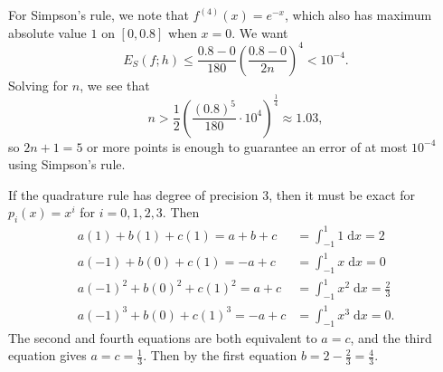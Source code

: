 \documentclass{homework}
\begin{document}
\begin{alphaparts}
		For Simpson's rule, we note that $f^{(4)}(x) = e^{-x}$, which also has maximum absolute value $1$ on $[0,0.8]$ when $x = 0$. We want
		\begin{equation*}
			E_S(f;h) \le \frac{0.8 - 0}{180}\left(\frac{0.8-0}{2n}\right)^4 < 10^{-4}.
		\end{equation*}
		Solving for $n$, we see that
		\begin{equation*}
			n > \frac{1}{2}\left(\frac{(0.8)^5}{180}\cdot 10^{4}\right)^\frac{1}{4} \approx 1.03,
		\end{equation*}
		so $2n+1 = 5$ or more points is enough to guarantee an error of at most $10^{-4}$ using Simpson's rule.
	\end{alphaparts}
	
	\question If the quadrature rule has degree of precision 3, then it must be exact for $p_i(x) = x^i$ for $i=0,1,2,3$. Then
	\begin{align*}
		a(1) + b(1) + c(1) = a+b+c &= \int_{-1}^1 1\;\text{d}x = 2 \\
		a(-1) + b(0) + c(1) = -a + c &= \int_{-1}^1 x\;\text{d}x = 0 \\
		a(-1)^2 + b(0)^2 + c(1)^2 = a+ c &= \int_{-1}^1 x^2\;\text{d}x = \frac{2}{3} \\
		a(-1)^3 + b(0) + c(1)^3 = -a + c &= \int_{-1}^1x^3\;\text{d}x = 0.
	\end{align*}
	The second and fourth equations are both equivalent to $a = c$, and the third equation gives $a = c = \frac{1}{3}$. Then by the first equation $b = 2-\frac{2}{3} = \frac{4}{3}$.
\end{document}
